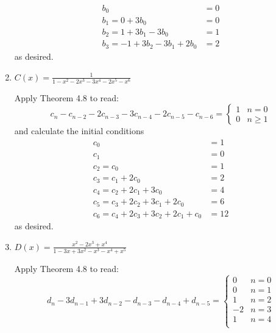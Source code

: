 \documentclass[class=math239,notes]{agony}
\begin{document}
\begin{enumerate}
\begin{sol}
          \begin{align*}
            b_0                           & = 0 \\
            b_1 = 0 + 3b_0                & = 0 \\
            b_2 = 1 + 3b_1 - 3b_0         & = 1 \\
            b_3 = -1 + 3b_2 - 3b_1 + 2b_0 & = 2
          \end{align*}
          as desired.
        \end{sol}
  \item $C(x) = \frac{1}{1 - x^2 - 2x^3 - 3x^4 - 2x^5 - x^6}$
        \begin{sol}
          Apply Theorem 4.8 to read:
          \[
            c_n - c_{n-2} - 2c_{n-3} - 3c_{n-4} - 2c_{n-5} - c_{n-6} = \begin{cases}
              1 & n = 0    \\
              0 & n \geq 1
            \end{cases}
          \]
          and calculate the initial conditions
          \begin{align*}
            c_0                                  & = 1  \\
            c_1                                  & = 0  \\
            c_2 = c_0                            & = 1  \\
            c_3 = c_1 + 2c_0                     & = 2  \\
            c_4 = c_2 + 2c_1 + 3c_0              & = 4  \\
            c_5 = c_3 + 2c_2 + 3c_1 + 2c_0       & = 6  \\
            c_6 = c_4 + 2c_3 + 3c_2 + 2c_1 + c_0 & = 12
          \end{align*}
          as desired.
        \end{sol}
  \item $D(x) = \frac{x^2 - 2x^3 + x^4}{1 - 3x + 3x^2 - x^3 - x^4 + x^5}$
        \begin{sol}
          Apply Theorem 4.8 to read:
          \[
            d_n - 3d_{n-1} + 3d_{n-2} - d_{n-3} - d_{n-4} + d_{n-5} = \begin{cases}
              0  & n = 0    \\
              0  & n = 1    \\
              1  & n = 2    \\
              -2 & n = 3    \\
              1  & n = 4    \\

\end{cases}\]
\end{sol}
\end{enumerate}
\end{document}
